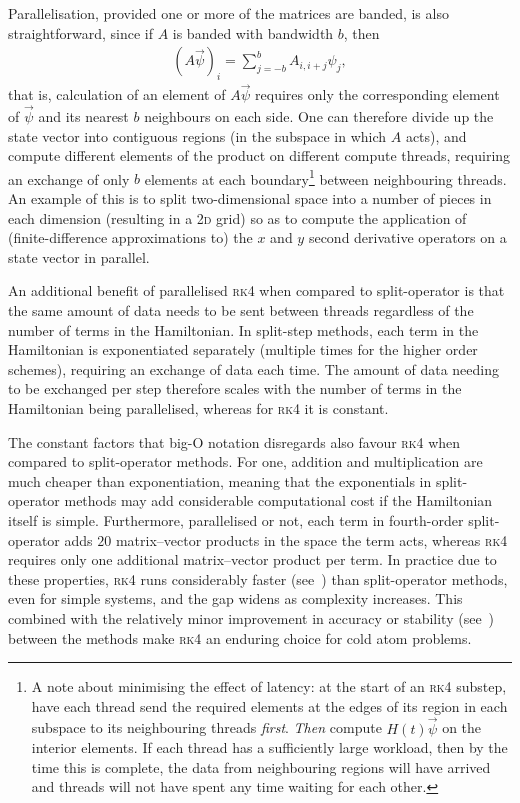 Parallelisation, provided one or more of the matrices are banded, is also straightforward, since if $A$ is banded with bandwidth $b$, then
\begin{align}
(A \vec \psi)_i = \sum_{j=-b}^b A_{i, i+j} \psi_j,
\end{align}
that is, calculation of an element of $A\vec\psi$ requires only the corresponding element of $\vec \psi$ and its nearest $b$ neighbours on each side. One can therefore divide up the state vector into contiguous regions (in the subspace in which $A$ acts), and compute different elements of the product on different compute threads, requiring an exchange of only $b$ elements at each boundary\footnote{A note about minimising the effect of latency: at the start of an \textsc{rk4} substep, have each thread send the required elements at the edges of its region in each subspace to its neighbouring threads \emph{first}. \emph{Then} compute $H(t)\vec\psi$ on the interior elements. If each thread has a sufficiently large workload, then by the time this is complete, the data from neighbouring regions will have arrived and threads will not have spent any time waiting for each other.} between neighbouring threads. An example of this is to split two-dimensional space into a number of pieces in each dimension (resulting in a 2\textsc{d} grid) so as to compute the application of (finite-difference approximations to) the $x$ and $y$ second derivative operators on a state vector in parallel.

An additional benefit of parallelised \textsc{rk4} when compared to split-operator is that the same amount of data needs to be sent between threads regardless of the number of terms in the Hamiltonian. In split-step methods, each term in the Hamiltonian is exponentiated separately (multiple times for the higher order schemes), requiring an exchange of data each time. The amount of data needing to be exchanged per step therefore scales with the number of terms in the Hamiltonian being parallelised, whereas for \textsc{rk4} it is constant.

The constant factors that big-O notation disregards also favour \textsc{rk4} when compared to split-operator methods. For one, addition and multiplication are much cheaper than exponentiation, meaning that the exponentials in split-operator methods may add considerable computational cost if the Hamiltonian itself is simple. Furthermore, parallelised or not, each term in fourth-order split-operator adds $20$ matrix--vector products in the space the term acts, whereas \textsc{rk4} requires only one additional matrix--vector product per term. In practice due to these properties, \textsc{rk4} runs considerably faster (see~) than split-operator methods, even for simple systems, and the gap widens as complexity increases. This combined with the relatively minor improvement in accuracy or stability (see~) between the methods make \textsc{rk4} an enduring choice for cold atom problems.

